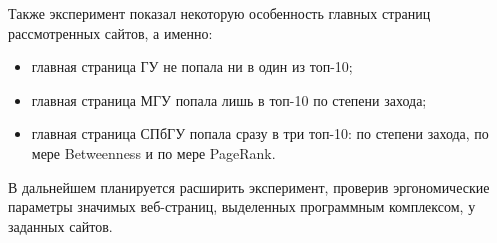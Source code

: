 Также эксперимент показал некоторую особенность главных страниц рассмотренных сайтов, а именно:
\begin{itemize}
	\item главная страница ГУ не попала ни в один из топ-10;
	\item главная страница МГУ попала лишь в топ-10 по степени захода;
	\item главная страница СПбГУ попала сразу в три топ-10: по степени захода, по мере Betweenness и по мере PageRank. 
\end{itemize}

В дальнейшем планируется расширить эксперимент, проверив эргономические параметры значимых веб-страниц, выделенных программным комплексом, у заданных сайтов. 

\FloatBarrier
